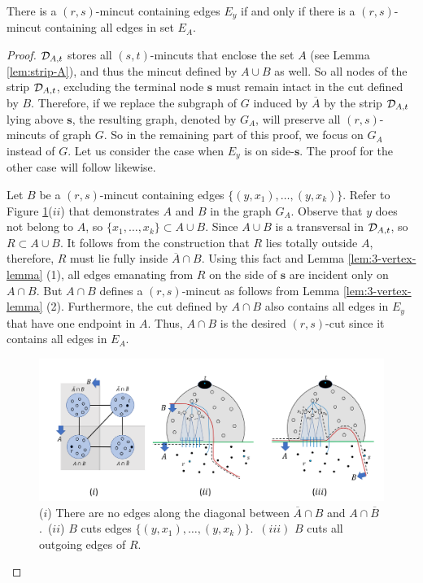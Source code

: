 \begin{lemma}
\label{lem:query-transformation}
\noindent
There is a $(r,s)$-mincut containing edges $E_y$ if and only if there is a $(r,s)$-mincut containing all edges in set $E_A$. 
\end{lemma}
\begin{proof}
${\cal D}_{A,t}$ stores all $(s,t)$-mincuts that enclose the set $A$ (see Lemma \ref{lem:strip-A}), and thus the mincut defined by $A\cup B$ as well. So all nodes of the strip ${\cal D}_{A,t}$, excluding the terminal node ${\mathbf{s}}$ must remain intact in the cut defined by $B$. Therefore, if we replace the subgraph of $G$ induced by $\overline{A}$ by the strip ${\cal D}_{A,t}$ lying above ${\mathbf{s}}$, the resulting graph, denoted by $G_A$, will preserve all $(r,s)$-mincuts of graph $G$. So in the remaining part of this proof, %
we focus on $G_A$ instead of $G$. 
Let us consider the case when $E_y$ is on side-$\mathbf{s}$.
The proof for the other case will follow likewise.

Let $B$ be a $(r,s)$-mincut containing edges $\{(y,x_1),\ldots,(y,x_k)\}$.
Refer to Figure \ref{fig:B-crosses-A}($ii$) that demonstrates $A$ and $B$ in the graph $G_A$.
Observe that $y$ does not belong to $A$, so $\{x_1,\ldots,x_k\}\subset A\cup B$.
Since $A\cup B$ is a transversal in ${\cal D}_{A,t}$, so $R\subset A\cup B$. It follows from the construction that $R$ lies totally outside $A$, therefore, $R$ must lie fully inside $\overline{A}\cap B$. Using this fact and Lemma \ref{lem:3-vertex-lemma} (1), all edges emanating from $R$ on the side of $\mathbf{s}$
are incident only on $A\cap B$. But $A\cap B$ defines a $(r,s)$-mincut as follows from Lemma \ref{lem:3-vertex-lemma} (2). 
Furthermore, the cut defined by $A\cap B$ also contains all edges in $E_y$ that have one endpoint in $A$.
Thus, $A\cap B$ is the desired $(r,s)$-cut since it contains all edges in $E_A$.
\begin{figure}[h]
    \centering
    \includegraphics[width=\textwidth]{src/images/compressed-image-i-ii.pdf}{}
    \caption{($i$) There are no edges along the diagonal between $\overline{A}\cap {B}$ and $A\cap \overline{B}$.~($ii$) $B$ cuts edges $\{(y,x_1),\ldots,(y,x_k)\}$.~$(iii)$ $B$ cuts all outgoing edges of $R$.}
    \label{fig:B-crosses-A}
\end{figure}


\end{proof}
